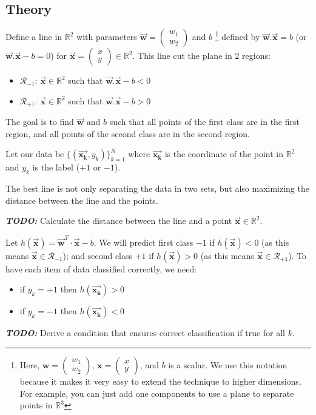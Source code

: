 \documentclass[]{article}
\newcommand{\R}{\mathbb{R}}
\newcommand{\vecx}{ \vec{\mathbf{x}} }
\newcommand{\vecxk}{ \vec{\mathbf{x_k}} }
\newcommand{\vecw}{ \vec{\mathbf{w}} }
\begin{document}
	\subsection{Theory}
	Define a line in $\R^2$ with parameters $\vecw = \begin{pmatrix} w_1 \\ w_2 \end{pmatrix}$ and $b$
	\footnote{
		Here, $\mathbf{w} = \begin{pmatrix} w_1 \\ w_2 \end{pmatrix}$, $\mathbf{x} = \begin{pmatrix} x \\ y \end{pmatrix}$, and $b$ is a scalar. We use this notation because it makes it very easy to extend the technique to higher dimensions. For example, you can just add one components to use a plane to separate points in $\mathbb{R}^3$
		}
	defined by $\vecw.\vecx = b$ (or $\vecw.\vecx - b = 0$) for $\vecx = \begin{pmatrix} x \\ y \end{pmatrix} \in \R^2$.
	This line cut the plane in 2 regions:
	\begin{itemize}
		\item $\mathcal{R}_{-1}$: $\vecx \in \R^2$ such that $\vecw.\vecx - b < 0$
		\item $\mathcal{R}_{+1}$: $\vecx \in \R^2$ such that $\vecw.\vecx - b > 0$
	\end{itemize}
	The goal is to find $\vecw$ and $b$ such that all points of the first class are in the first region, and all points of the second class are in the second region.
	
	Let our data be $\{ (\vecxk, y_k) \}_{k=1}^N$ where $\vecxk$ is the coordinate of the point in $\R^2$ and $y_k$ is the label ($+1$ or $-1$).
	
	The best line is not only separating the data in two sets, but also maximizing the distance between the line and the points.
	
	\noindent \textbf{\textit{TODO:}}
	Calculate the distance between the line and a point $\vecx \in \R^2$.
	
	\vspace{0.5cm}
	
	Let $h(\vecx) = \vecw^T \cdot \vecx - b$.
	We will predict first class $-1$ if $h(\vecx)<0$ (as this means $\vecx \in \mathcal{R}_{-1}$); and second class $+1$ if $h(\vecx)>0$ (as this means $\vecx \in \mathcal{R}_{+1}$).
	To have each item of data classified correctly, we need:
	\begin{itemize}
		\item if $y_k = +1$ then $h(\vecxk)>0$
		\item if $y_k = -1$ then $h(\vecxk)<0$
	\end{itemize}
	\noindent \textbf{\textit{TODO:}}
	Derive a condition that ensures correct classification if true for all $k$.
	
\end{document}
